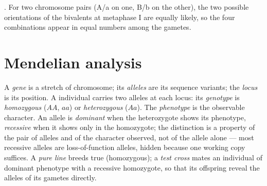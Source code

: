 \begin{omfigure}

{\small {}. For two chromosome pairs (A/a on
one, B/b on the other), the two possible orientations of the
bivalents at metaphase I are equally likely, so the four 
combinations appear in equal numbers among the gametes.}
\end{omfigure}

\section{Mendelian analysis}

\begin{definition}\label{def:b2:meiosis-heredity:vocabulary}
A \emph{gene} is a stretch of chromosome; its \emph{alleles} are its
sequence variants; the \emph{locus} is its position. A 
individual carries two alleles at each locus: its \emph{genotype}
is \emph{homozygous} ($AA$, $aa$) or \emph{heterozygous} ($Aa$).
The \emph{phenotype} is the observable character. An allele is
\emph{dominant} when the heterozygote shows its phenotype,
\emph{recessive} when it shows only in the homozygote; the
distinction is a property of the pair of alleles and of the
character observed, not of the allele alone --- most recessive
alleles are loss-of-function alleles, hidden because one working
copy suffices. A \emph{pure line} breeds true (homozygous); a
\emph{test cross} mates an individual of dominant phenotype with a
recessive homozygote, so that its offspring reveal the alleles of
its gametes directly.
\end{definition}

